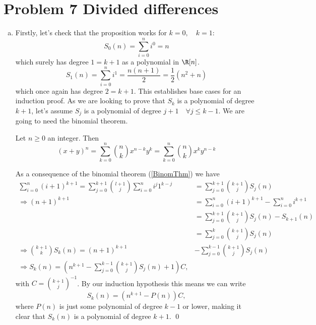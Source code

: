 \section{Problem 7 Divided differences}
\begin{enumerate}[a)]
  \item

Firstly, let's check that the proposition works for $k=0, \quad k=1$:
  $$ S_0(n) = \sum_{i=0}^{n}i^0= n $$
which surely has degree $1=k+1$ as a polynomial in $\R[n]$.
  $$ S_1(n) = \sum_{i=0}^{n}i^1 = \frac{n(n+1)}{2} = \frac{1}{2}(n^2+n) $$
which once again has degree $2 = k+1$. This establishes base cases for an induction proof. As we are looking to prove that $S_{k}$ is a polynomial of degree $k+1$, let's assume $S_{j}$ is a polynomial of degree $j+1 \quad \forall j\leq k-1$.
\newline We are going to need the binomial theorem.

\begin{theorem}\label{BinomThm}
  Let $n\geq 0$ an integer. Then
  \begin{equation}
    \left(x+y\right)^n = \sum_{k=0}^{n}\binom{n}{k}x^{n-k}y^k = \sum_{k=0}^{n}\binom{n}{k}x^ky^{n-k}
  \end{equation}
\end{theorem}

As a consequence of the binomial theorem (\ref{BinomThm}) we have
  \begin{align*}
   \sum_{i=0}^{n}(i+1)^{k+1} = \sum_{j=0}^{k+1}\binom{l+1}{j}\sum_{i=0}^{n}i^j 1^{k-j} & = \sum_{j=0}^{k+1}\binom{k+1}{j}S_j(n) \\
      \Longrightarrow (n+1)^{k+1} & = \sum_{i=0}^{n}(i+1)^{k+1} - \sum_{i=0}^{n}i^{k+1} \\
        & = \sum_{j=0}^{k+1}\binom{k+1}{j}S_j(n) - S_{k+1}(n) \\
        & = \sum_{j=0}^{k}\binom{k+1}{j}S_j(n) \\
      \Longrightarrow  \binom{k+1}{k}S_k(n)=(n+1)^{k+1} & -  \sum_{j=0}^{k-1}\binom{k+1}{j}S_j(n) \\
      \Longrightarrow S_k(n) = \left(n^{k+1} - \sum_{j=0}^{k-1}\binom{k+1}{j}S_j(n) + 1\right)C,
  \end{align*}
  with $C=\binom{k+1}{j}^{-1}$.
By our induction hypothesis this means we can write
  $$ S_k(n) = \left(n^{k+1} - P(n)\right)C, $$
where $P(n)$ is just some polynomial of degree $k-1$ or lower, making it clear that $S_k(n)$ is a polynomial of degree $k+1$.
\qed


\end{enumerate}
